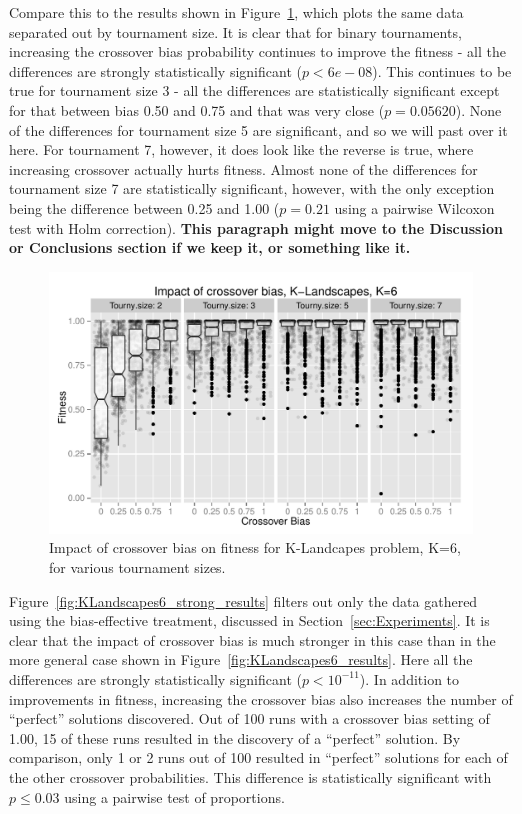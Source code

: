 \documentclass{sig-alternate}
\begin{document}
Compare this to the results shown in Figure~\ref{fig:KLandscapes6_XO_bias_impact_facets}, which plots the same data
separated out by tournament size. It is clear that for binary tournaments, increasing the crossover bias probability
continues to improve the fitness - all the differences are strongly statistically significant ($p<6e-08$). This
continues to be true for tournament size 3 - all the differences are statistically significant except for that between
bias 0.50 and 0.75 and that was very close ($p=0.05620$). None of the differences for tournament size 5 are
significant, and so we will past over it here. For tournament 7, however, it does look like the reverse is true, where
increasing crossover actually hurts fitness. Almost none of the differences for tournament size 7 are statistically
significant, however, with the only exception being the difference between 0.25 and 1.00 ($p=0.21$ using a pairwise
Wilcoxon test with Holm correction). \textbf{This paragraph might move to the Discussion or Conclusions section if we
keep it, or something like it.}

\begin{figure}
\centering
\includegraphics[width=0.45 \textwidth]{Plots/KLandscapes6_XO_bias_impact_facets.pdf}
\caption{Impact of crossover bias on fitness for K-Landcapes problem, K=6, for various tournament sizes.}
\label{fig:KLandscapes6_XO_bias_impact_facets}
\end{figure}

Figure~\ref{fig:KLandscapes6_strong_results} filters out only the data gathered using the bias-effective treatment,
discussed in Section~\ref{sec:Experiments}. It is clear that the impact of crossover bias is much stronger in this case
than in the more general case shown in Figure~\ref{fig:KLandscapes6_results}. Here all the differences are strongly
statistically significant ($p < 10^{-11}$). In addition to improvements in fitness, increasing the crossover bias also
increases the number of ``perfect'' solutions discovered. Out of 100 runs with a crossover bias setting of 1.00, 15 of
these runs resulted in the discovery of a ``perfect'' solution. By comparison, only 1 or 2 runs out of 100 resulted in
``perfect'' solutions for each of the other crossover probabilities. This difference is statistically significant with
$p \leq 0.03$ using a pairwise test of proportions.
\end{document}
